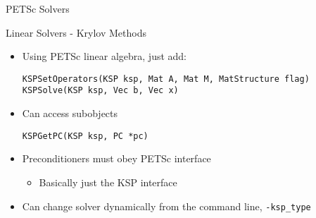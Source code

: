 \begin{frame}[fragile]{PETSc Solvers}

\begin{block}{Linear Solvers - Krylov Methods}
 \begin{itemize}
  \item Using PETSc linear algebra, just add:
  \begin{lstlisting}[basicstyle=\footnotesize\ttfamily]
KSPSetOperators(KSP ksp, Mat A, Mat M, MatStructure flag)
KSPSolve(KSP ksp, Vec b, Vec x)
  \end{lstlisting}

  \item Can access subobjects
  \begin{lstlisting}[basicstyle=\footnotesize\ttfamily]
KSPGetPC(KSP ksp, PC *pc)
  \end{lstlisting}

  \item Preconditioners must obey PETSc interface
  \begin{itemize}
    \item Basically just the KSP interface
  \end{itemize}

  \item Can change solver dynamically from the command line, \lstinline|-ksp_type|
\end{itemize}
\end{block}

\end{frame}

